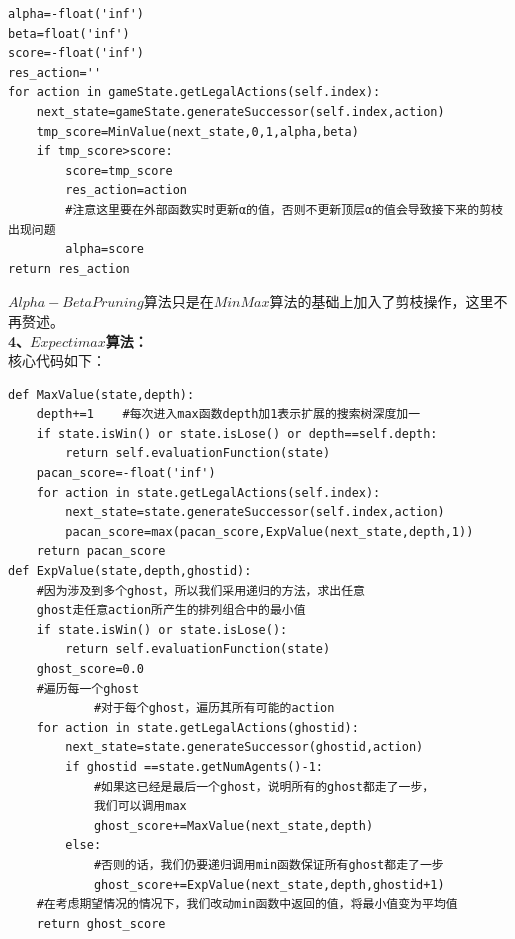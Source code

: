 \documentclass[a4paper,12pt,UTF8]{article}
\begin{document}
\begin{flushleft}
{{\begin{lstlisting}
alpha=-float('inf')
beta=float('inf')
score=-float('inf')
res_action=''
for action in gameState.getLegalActions(self.index):
    next_state=gameState.generateSuccessor(self.index,action)
    tmp_score=MinValue(next_state,0,1,alpha,beta)
    if tmp_score>score:
        score=tmp_score
        res_action=action
        #注意这里要在外部函数实时更新α的值，否则不更新顶层α的值会导致接下来的剪枝出现问题
        alpha=score
return res_action
        \end{lstlisting}
    }
    \normalsize{
        \hspace{1cm}$Alpha-Beta Pruning$算法只是在$MinMax$算法的基础上加入了剪枝操作，这里不再赘述。\\
    }
    \large{
        \hspace{1cm}\textbf{4、$Expectimax$算法：\\}
    }
    \normalsize{
        \hspace{1cm}核心代码如下：\\
    }
    \scriptsize{
        \begin{lstlisting}
def MaxValue(state,depth):
    depth+=1    #每次进入max函数depth加1表示扩展的搜索树深度加一
    if state.isWin() or state.isLose() or depth==self.depth:
        return self.evaluationFunction(state)
    pacan_score=-float('inf')
    for action in state.getLegalActions(self.index):
        next_state=state.generateSuccessor(self.index,action)
        pacan_score=max(pacan_score,ExpValue(next_state,depth,1))
    return pacan_score
def ExpValue(state,depth,ghostid):
    #因为涉及到多个ghost，所以我们采用递归的方法，求出任意
    ghost走任意action所产生的排列组合中的最小值
    if state.isWin() or state.isLose():
        return self.evaluationFunction(state)
    ghost_score=0.0
    #遍历每一个ghost         
            #对于每个ghost，遍历其所有可能的action
    for action in state.getLegalActions(ghostid):
        next_state=state.generateSuccessor(ghostid,action)
        if ghostid ==state.getNumAgents()-1:
            #如果这已经是最后一个ghost，说明所有的ghost都走了一步，
            我们可以调用max
            ghost_score+=MaxValue(next_state,depth)
        else:
            #否则的话，我们仍要递归调用min函数保证所有ghost都走了一步
            ghost_score+=ExpValue(next_state,depth,ghostid+1)
    #在考虑期望情况的情况下，我们改动min函数中返回的值，将最小值变为平均值
    return ghost_score


\end{lstlisting}}}
\end{flushleft}
\end{document}
